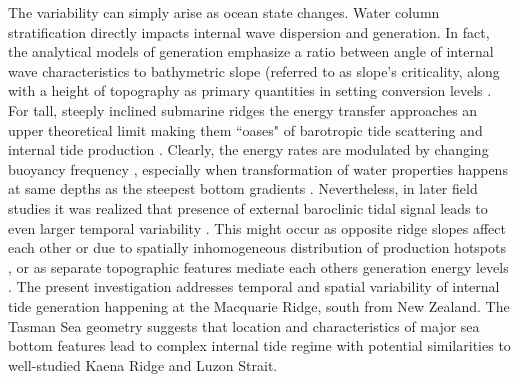 \documentclass[12pt]{article}
\begin{document}
The variability can simply arise as ocean state changes. Water column stratification directly 
impacts internal wave dispersion and generation. In fact, the analytical models of generation 
emphasize a ratio between angle of internal wave characteristics to bathymetric slope (referred to 
as slope's criticality, \citep{sutherland2010internal, garrett2007internal} along with a height of 
topography as primary 
quantities in setting conversion levels \citep{llewellyn2003tidal, petrelis2006tidal}. For tall, 
steeply inclined submarine ridges the energy transfer approaches an upper theoretical limit 
\citep{petrelis2006tidal, st2003generation} making them ``oases" of barotropic tide 
scattering and internal tide production \citep{morozov1995semidiurnal, egbert2000significant}. 
Clearly, the energy rates are modulated by changing buoyancy frequency 
\citep{holloway1999internal}, especially when transformation of water properties happens at same 
depths as the steepest bottom gradients \citep{gerkema2004internal}. Nevertheless, in later field 
studies it was realized that presence of external baroclinic tidal signal leads to even larger 
temporal variability \citep{Kelly2010a, zilberman2011incoherent, pickering2015structure}. This 
might occur as opposite ridge slopes affect each other \citep{nash2004internal, 
zilberman2011incoherent, echeverri2010internal} or due to spatially inhomogeneous distribution of 
production hotspots \citep{osborne2011spatial, ponte2013coastal}, or as separate topographic 
features mediate each others generation energy levels \citep{xing1998three, buijsman2012modeling, 
buijsman2014three, klymak2013parameterizing}. The present investigation addresses 
temporal and spatial variability of internal tide generation happening at the Macquarie Ridge, 
south from 
New Zealand. The Tasman Sea geometry  suggests that 
location and characteristics of major sea bottom features lead to complex internal tide regime with 
potential similarities to well-studied Kaena Ridge and Luzon Strait.\\
\end{document}
